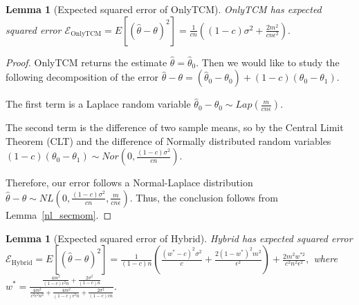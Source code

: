 \documentclass{article}
\theoremstyle{plain}
\newtheorem{lem}[thm]{Lemma}
\begin{document}
\begin{lem}[Expected squared error of OnlyTCM]
\label{MSE_OnlyTCM}
OnlyTCM has expected squared error
$\mathcal{E}_{\text{OnlyTCM}} = E[(\hat{\theta} - \theta)^2] = \frac{1}{cn}\left((1-c)\sigma^2 + \frac{2m^2}{cn \epsilon^2 }\right).$
\end{lem}
\begin{proof}
OnlyTCM returns the estimate $\hat{\theta} = \hat{\theta}_0$. Then we would like to study the following decomposition of the error
$\hat{\theta} - \theta = (\hat{\theta}_0 - \theta_0) + (1-c)(\theta_0 - \theta_1).$

The first term is a Laplace random variable
$\hat{\theta}_0 - \theta_0 \sim Lap\left(\frac{m}{cn\epsilon}\right).$

The second term is the difference of two sample means, so by the Central Limit Theorem (CLT) and the difference of Normally distributed random variables
$(1-c)(\theta_0 - \theta_1) \sim Nor\left(0, \frac{(1-c)\sigma^2}{cn}\right).$

Therefore, our error follows a Normal-Laplace distribution
$\hat{\theta} - \theta \sim NL\left(0, \frac{(1-c)\sigma^2}{cn}, \frac{m}{cn\epsilon} \right).$
Thus, the conclusion follows from Lemma~\ref{nl_secmom}.
\end{proof}

\begin{lem}[Expected squared error of Hybrid]\label{lem:hybrid-error}
Hybrid has expected squared error 
$\mathcal{E}_{\text{Hybrid}} = E[(\hat{\theta} - \theta)^2] = \frac{1}{(1-c)n}\left(\frac{(w^*-c)^2\sigma^2}{c} + \frac{2(1-w^*)^2 m^2}{\epsilon^2}\right) + \frac{2m^2w^{*2}}{c^2n^2\epsilon^2},$
where
$w^* = \frac{\frac{4 m^2}{(1-c) \epsilon^2 n}+\frac{2 \sigma^2}{(1-c) n}}{\frac{4 m^2}{c^2 \epsilon^2 n^2}+\frac{4 m^2}{(1-c) \epsilon^2 n}+\frac{2 \sigma^2}{(1-c) c n}}.$
\end{lem}
\end{document}
